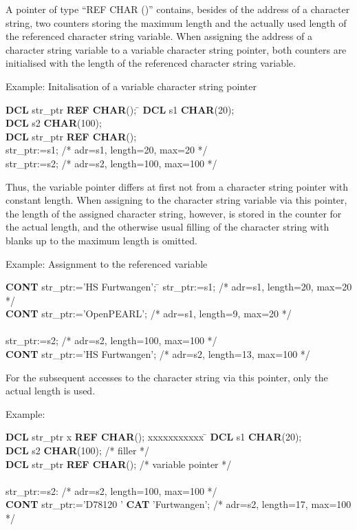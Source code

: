 A pointer of type ``REF CHAR ()'' contains, besides of the address of a
character string, two counters storing the maximum length and the
actually used length of the referenced character string variable. When
assigning the address of a character string variable to a variable
character string pointer, both counters are initialised with the length
of the referenced character string variable.

Example: Initalisation of a variable character string pointer

\begin{tabbing}
{\bf DCL} str\_ptr \= {\bf REF CHAR}(); \= \kill
{\bf DCL} s1 \> {\bf CHAR}(20); \> \\
{\bf DCL} s2 \> {\bf CHAR}(100); \> \\
{\bf DCL} str\_ptr \> {\bf REF CHAR}(); \> \\
str\_ptr:=s1; \> \> /* adr=s1, length=20, max=20 */ \\
str\_ptr:=s2; \> \> /* adr=s2, length=100, max=100 */
\end{tabbing}

Thus, the variable pointer differs at first not from a character string
pointer with constant length. When assigning to the character string
variable via this pointer, the length of the assigned character string,
however, is stored in the counter for the actual length, and the
otherwise usual filling of the character string with blanks up to the
maximum length is omitted.

Example: Assignment to the referenced variable

\begin{tabbing}
{\bf CONT} str\_ptr:='HS Furtwangen'; \= \kill
str\_ptr:=s1; \> /* adr=s1, length=20, max=20 */ \\
{\bf CONT} str\_ptr:='OpenPEARL'; \> /* adr=s1, length=9, max=20 */ \\
 \> \\
str\_ptr:=s2; \> /* adr=s2, length=100, max=100 */ \\
{\bf CONT} str\_ptr:='HS Furtwangen'; \> /* adr=s2, length=13, max=100 */
\end{tabbing}

For the subsequent accesses to the character string via this pointer,
only the actual length is used.

Example:

\begin{tabbing}
{\bf DCL} str\_ptr x \= {\bf REF CHAR}(); xxxxxxxxxxx \= \kill
{\bf DCL} s1 \> {\bf CHAR}(20); \> \\
{\bf DCL} s2 \> {\bf CHAR}(100); \> /* filler */ \\
{\bf DCL} str\_ptr \> {\bf REF CHAR}(); \> /* variable pointer */       \\
 \> \> \\
str\_ptr:=s2: \> \> /* adr=s2, length=100, max=100 */ \\
{\bf CONT} str\_ptr:='D78120 ' {\bf CAT} 'Furtwangen'; \> \> /* adr=s2, length=17, max=100 */
\end{tabbing}

